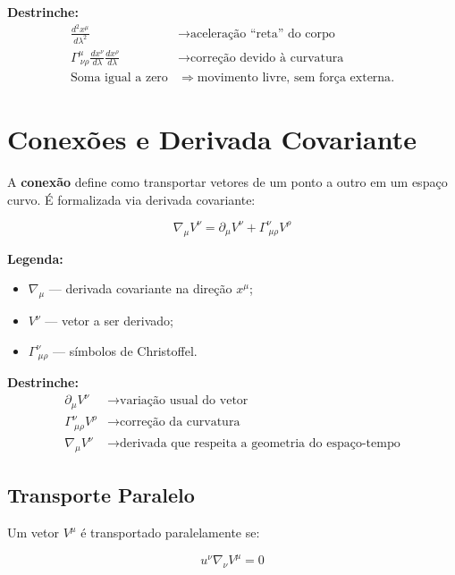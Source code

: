 \documentclass[a4paper,12pt]{article}
\begin{document}
\textbf{Destrinche:}
\begin{align*}
\frac{d^2 x^\mu}{d\lambda^2} &\rightarrow \text{aceleração “reta” do corpo} \\
\Gamma^{\mu}_{\ \nu\rho} \frac{dx^\nu}{d\lambda} \frac{dx^\rho}{d\lambda} &\rightarrow \text{correção devido à curvatura} \\
\text{Soma igual a zero} &\Rightarrow \text{movimento livre, sem força externa}.
\end{align*}

\section*{Conexões e Derivada Covariante}

A \textbf{conexão} define como transportar vetores de um ponto a outro em um espaço curvo.  
É formalizada via derivada covariante:

\begin{equation}
\nabla_\mu V^\nu = \partial_\mu V^\nu + \Gamma^{\nu}_{\ \mu\rho} V^\rho
\end{equation}

\textbf{Legenda:}
\begin{itemize}
    \item $\nabla_\mu$ — derivada covariante na direção $x^\mu$;
    \item $V^\nu$ — vetor a ser derivado;
    \item $\Gamma^{\nu}_{\ \mu\rho}$ — símbolos de Christoffel.
\end{itemize}

\textbf{Destrinche:}
\begin{align*}
\partial_\mu V^\nu &\rightarrow \text{variação usual do vetor} \\
\Gamma^{\nu}_{\ \mu\rho} V^\rho &\rightarrow \text{correção da curvatura} \\
\nabla_\mu V^\nu &\rightarrow \text{derivada que respeita a geometria do espaço-tempo}
\end{align*}

\subsection*{Transporte Paralelo}

Um vetor \(V^\mu\) é transportado paralelamente se:

\begin{equation}
u^\nu \nabla_\nu V^\mu = 0
\end{equation}
\end{document}
